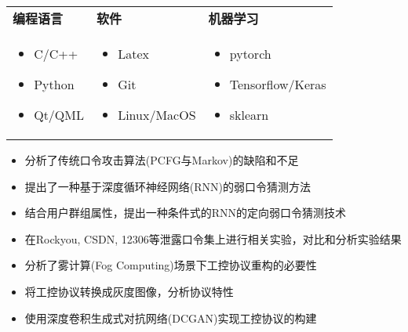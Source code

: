 ﻿\documentclass{resume}
\author{陆\ \ 楚}
\begin{document}
\maketitle

\TechnicalSkills
\begin{table}[H]
	\centering
	\begin{tabularx}{\textwidth}{X X X}
         \textbf{编程语言} & \textbf{软件}  & \textbf{机器学习}\\
		\begin{itemize}
			\item C/C++
			\item Python
			\item Qt/QML
		\end{itemize} &
		\begin{itemize}
			\item Latex
			\item Git
			\item Linux/MacOS
		\end{itemize} &
        \begin{itemize}
            \item pytorch
            \item Tensorflow/Keras
            \item sklearn
        \end{itemize}
	\end{tabularx}
\end{table}
\vspace{-4em} %
\Education



\TechnicalProjects
\begin{itemize}
	\item 分析了传统口令攻击算法(PCFG与Markov)的缺陷和不足
	\item 提出了一种基于深度循环神经网络(RNN)的弱口令猜测方法
    \item 结合用户群组属性，提出一种条件式的RNN的定向弱口令猜测技术
    \item 在Rockyou, CSDN, 12306等泄露口令集上进行相关实验，对比和分析实验结果
\end{itemize}

\begin{itemize}
	\item 分析了雾计算(Fog Computing)场景下工控协议重构的必要性
	\item 将工控协议转换成灰度图像，分析协议特性
	\item 使用深度卷积生成式对抗网络(DCGAN)实现工控协议的构建
\end{itemize}
\end{document}
